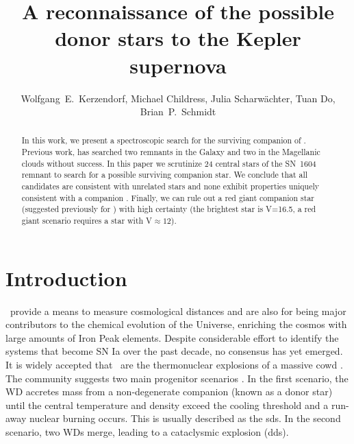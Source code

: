 \documentclass[preprint2]{aastex}
\begin{document}
\title{A reconnaissance of the possible donor stars to the Kepler supernova}

\author{Wolfgang~E.~Kerzendorf, Michael Childress, Julia Scharw\"{a}chter, Tuan Do, Brian~P.~Schmidt} 




\begin{abstract}
In this work, we present a spectroscopic search for the surviving companion of . Previous work, has searched two remnants in the Galaxy and two in the Magellanic clouds without success. In this paper we scrutinize 24 central stars  of the SN~1604 remnant to search for a possible surviving companion star. We conclude that all candidates are consistent with unrelated stars and none exhibit properties uniquely consistent with a companion . Finally, we can rule out a red giant companion star (suggested previously for ) with high certainty (the brightest star is V=16.5, a red giant scenario requires a star with V$\approx 12$).
\end{abstract}

\maketitle
\section{Introduction}

\sneia\ provide a means to measure cosmological distances and are also for being major contributors to the chemical evolution of the Universe, enriching the cosmos with large amounts of Iron Peak elements. Despite considerable effort to identify the systems that become SN Ia over the past decade, no consensus has yet emerged. It is widely accepted that \sneia\ are the thermonuclear explosions of a massive \gls{cowd} . The community suggests two main progenitor scenarios \cite[for a review see][and references therein]{2012NewAR..56..122W}. In the first scenario, the WD accretes mass from a non-degenerate companion (known as a donor star) until the central temperature and density exceed the cooling threshold and a run-away nuclear burning occurs. This is usually described as the \gls{sds}. In the second scenario, two WDs merge, leading to a cataclysmic explosion (\gls{dds}).
\end{document}
